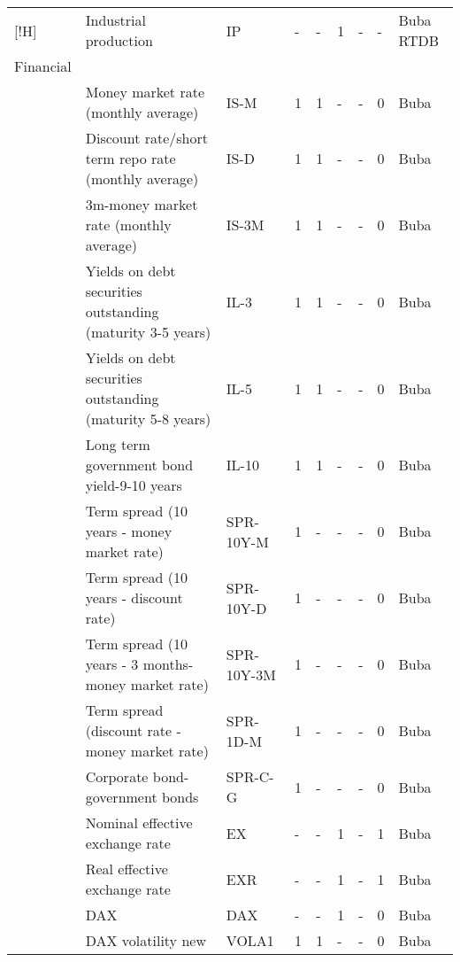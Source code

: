 \documentclass[10pt]{article}
\begin{document}
\begin{footnotesize}
\begin{longtable}{p{1in}|p{2.5in}|p{1in}|p{.1in}|p{.1in}|p{.1in}|p{.15in}|p{.1in}|p{.5in}}[!H]
& {\tiny{}Industrial production} & {\tiny{}IP} & {\tiny{}-} & {\tiny{}-} & {\tiny{}1} & {\tiny{}-} & {\tiny{}-} & {\tiny{}Buba RTDB}\tabularnewline
{\tiny{}Financial } &  &  &  &  &  &  &  & \tabularnewline
 & {\tiny{}Money market rate (monthly average)} & {\tiny{}IS-M} & {\tiny{}1} & {\tiny{}1} & {\tiny{}-} & {\tiny{}-} & {\tiny{}0} & {\tiny{}Buba}\tabularnewline
 & {\tiny{}Discount rate/short term repo rate (monthly average)} & {\tiny{}IS-D} & {\tiny{}1} & {\tiny{}1} & {\tiny{}-} & {\tiny{}-} & {\tiny{}0} & {\tiny{}Buba}\tabularnewline
 & {\tiny{}3m-money market rate (monthly average)} & {\tiny{}IS-3M} & {\tiny{}1} & {\tiny{}1} & {\tiny{}-} & {\tiny{}-} & {\tiny{}0} & {\tiny{}Buba}\tabularnewline
 & {\tiny{}Yields on debt securities outstanding (maturity 3-5 years)} & {\tiny{}IL-3} & {\tiny{}1} & {\tiny{}1} & {\tiny{}-} & {\tiny{}-} & {\tiny{}0} & {\tiny{}Buba}\tabularnewline
 & {\tiny{}Yields on debt securities outstanding (maturity 5-8 years)} & {\tiny{}IL-5} & {\tiny{}1} & {\tiny{}1} & {\tiny{}-} & {\tiny{}-} & {\tiny{}0} & {\tiny{}Buba}\tabularnewline
 & {\tiny{}Long term government bond yield-9-10 years} & {\tiny{}IL-10} & {\tiny{}1} & {\tiny{}1} & {\tiny{}-} & {\tiny{}-} & {\tiny{}0} & {\tiny{}Buba}\tabularnewline
 & {\tiny{}Term spread (10 years - money market rate)} & {\tiny{}SPR-10Y-M} & {\tiny{}1} & {\tiny{}-} & {\tiny{}-} & {\tiny{}-} & {\tiny{}0} & {\tiny{}Buba}\tabularnewline
 & {\tiny{}Term spread (10 years - discount rate)} & {\tiny{}SPR-10Y-D} & {\tiny{}1} & {\tiny{}-} & {\tiny{}-} & {\tiny{}-} & {\tiny{}0} & {\tiny{}Buba}\tabularnewline
 & {\tiny{}Term spread (10 years - 3 months-money market rate)} & {\tiny{}SPR-10Y-3M} & {\tiny{}1} & {\tiny{}-} & {\tiny{}-} & {\tiny{}-} & {\tiny{}0} & {\tiny{}Buba}\tabularnewline
 & {\tiny{}Term spread (discount rate - money market rate)} & {\tiny{}SPR-1D-M} & {\tiny{}1} & {\tiny{}-} & {\tiny{}-} & {\tiny{}-} & {\tiny{}0} & {\tiny{}Buba}\tabularnewline
 & {\tiny{}Corporate bond-government bonds} & {\tiny{}SPR-C-G} & {\tiny{}1} & {\tiny{}-} & {\tiny{}-} & {\tiny{}-} & {\tiny{}0} & {\tiny{}Buba}\tabularnewline
 & {\tiny{}Nominal effective exchange rate} & {\tiny{}EX} & {\tiny{}-} & {\tiny{}-} & {\tiny{}1} & {\tiny{}-} & {\tiny{}1} & {\tiny{}Buba}\tabularnewline
 & {\tiny{}Real effective exchange rate} & {\tiny{}EXR} & {\tiny{}-} & {\tiny{}-} & {\tiny{}1} & {\tiny{}-} & {\tiny{}1} & {\tiny{}Buba}\tabularnewline
 & {\tiny{}DAX} & {\tiny{}DAX} & {\tiny{}-} & {\tiny{}-} & {\tiny{}1} & {\tiny{}-} & {\tiny{}0} & {\tiny{}Buba}\tabularnewline
 & {\tiny{}DAX volatility new} & {\tiny{}VOLA1} & {\tiny{}1} & {\tiny{}1} & {\tiny{}-} & {\tiny{}-} & {\tiny{}0} & {\tiny{}Buba}\tabularnewline

\end{longtable}
\end{footnotesize}
\end{document}
